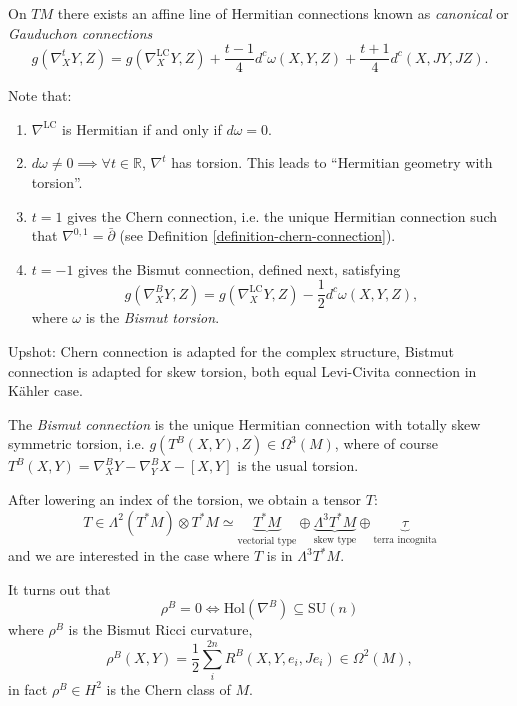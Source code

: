 \documentclass{book}
\begin{document}
\begin{theorem}[Gauduchon]
\label{theorem-gauduchon-connections}
On $TM$ there exists an affine line
of Hermitian connections known as
{\it canonical} or
{\it Gauduchon connections}
$$
g(\nabla_X^tY,Z)
=g(\nabla_X^{\text{LC}}Y,Z)
+\frac{t-1}{4}
d^c\omega(X,Y,Z)
+\frac{t+1}{4}
d^c(X,JY,JZ).
$$
\end{theorem}

\noindent
Note that:
\begin{enumerate}
\item $\nabla^{\text{LC}}$ is Hermitian
if and only if $d \omega=0$.
\item $d \omega \neq 0 \implies
\forall t \in \mathbb{R}$,
$\nabla^t$ has torsion. This leads to
``Hermitian geometry with torsion''.
\item $t=1$ gives the Chern connection,
i.e. the unique Hermitian connection
such that $\nabla^{0,1}=\bar\partial$
(see Definition
\ref{definition-chern-connection}).
\item $t=-1$ gives the Bismut connection,
defined next, satisfying
$$
g(\nabla_X^BY,Z)
=g(\nabla^{\text{LC}}_XY,Z)
-\frac{1}{2}d^c\omega(X,Y,Z),
$$
where $\omega$ is the {\it Bismut torsion}.
\end{enumerate}

\noindent
Upshot: Chern connection is adapted
for the complex structure,
Bistmut connection is adapted
for skew torsion,
both equal Levi-Civita connection in
Kähler case.

\begin{definition}
\label{definition-bismut-connection}
The {\it Bismut connection} is the
unique Hermitian connection with
totally skew symmetric torsion, i.e.
$g(T^B(X,Y),Z) \in \Omega^3(M)$,
where of course
$T^B(X,Y)=\nabla^B_XY-\nabla^B_YX-[X,Y]$
is the usual torsion.
\end{definition}

After lowering an index of the torsion,
we obtain a tensor $T$:
$$
T \in \Lambda^2(T^*M) \otimes T^*M
\simeq \underbrace{T^*M}_{\text{vectorial
type}} \oplus\underbrace{\Lambda^3T^*M}_{
\text{skew type}}
\oplus \underbrace{\tau}_{\text{
terra incognita}}
$$
and we are interested in the case
where $T$ is in $\Lambda^3T^*M$.

\medskip\noindent
It turns out that
$$
\rho^B=0 \iff
\text{Hol}(\nabla^B) \subseteq
\text{SU}(n)
$$
where $\rho^B$ is the
Bismut Ricci curvature,
$$
\rho^B(X,Y)
=\frac{1}{2}\sum_i^{2n}
R^B(X,Y,e_i,J e_i)
\in \Omega^2(M),
$$
in fact $\rho^B \in H^2$ is
the Chern class of $M$.
\end{document}
